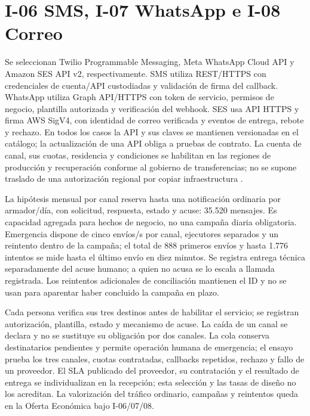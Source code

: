 \section*{I-06 SMS, I-07 WhatsApp e I-08 Correo}
Se seleccionan Twilio Programmable Messaging, Meta WhatsApp Cloud API y Amazon SES API v2, respectivamente. SMS utiliza REST/HTTPS con credenciales de cuenta/API custodiadas y validación de firma del callback. WhatsApp utiliza Graph API/HTTPS con token de servicio, permisos de negocio, plantilla autorizada y verificación del webhook. SES usa API HTTPS y firma AWS SigV4, con identidad de correo verificada y eventos de entrega, rebote y rechazo. En todos los casos la API y sus claves se mantienen versionadas en el catálogo; la actualización de una API obliga a pruebas de contrato. La cuenta de canal, sus cuotas, residencia y condiciones se habilitan en las regiones de producción y recuperación conforme al gobierno de transferencias; no se supone traslado de una autorización regional por copiar infraestructura \parencites{c8-twilio-mensajes,c8-meta-mensajes,c8-ses-eventos}.

La hipótesis mensual por canal reserva hasta una notificación ordinaria por armador/día, con solicitud, respuesta, estado y acuse: 35.520 mensajes. Es capacidad agregada para hechos de negocio, no una campaña diaria obligatoria. Emergencia dispone de cinco envíos/s por canal, ejecutores separados y un reintento dentro de la campaña; el total de 888 primeros envíos y hasta 1.776 intentos se mide hasta el último envío en diez minutos. Se registra entrega técnica separadamente del acuse humano; a quien no acusa se lo escala a llamada registrada. Los reintentos adicionales de conciliación mantienen el ID y no se usan para aparentar haber concluido la campaña en plazo.

Cada persona verifica sus tres destinos antes de habilitar el servicio; se registran autorización, plantilla, estado y mecanismo de acuse. La caída de un canal se declara y no se sustituye su obligación por dos canales. La cola conserva destinatarios pendientes y permite operación humana de emergencia; el ensayo prueba los tres canales, cuotas contratadas, callbacks repetidos, rechazo y fallo de un proveedor. El SLA publicado del proveedor, su contratación y el resultado de entrega se individualizan en la recepción; esta selección y las tasas de diseño no los acreditan. La valorización del tráfico ordinario, campañas y reintentos queda en la Oferta Económica bajo I-06/07/08.

